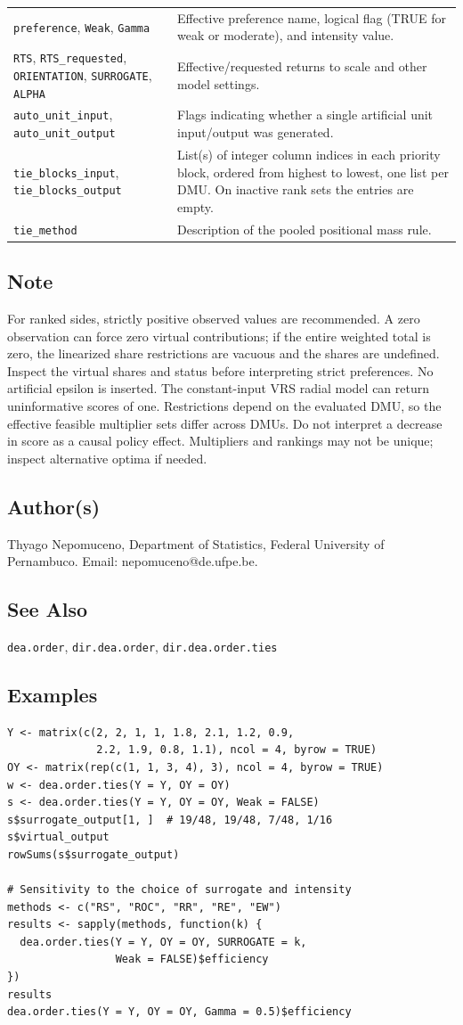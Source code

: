 \documentclass[10pt,a4paper]{article}
\newcommand{\field}[1]{\needspace{3\baselineskip}\subsection*{#1}}
\begin{document}
\begin{longtable}{@{}p{53mm}p{106mm}@{}}
\texttt{preference}, \texttt{Weak}, \texttt{Gamma} & Effective preference name, logical flag (TRUE for weak or moderate), and intensity value. \\[2pt]
\texttt{RTS}, \texttt{RTS\_requested}, \texttt{ORIENTATION}, \texttt{SURROGATE}, \texttt{ALPHA} & Effective/requested returns to scale and other model settings. \\[2pt]
\texttt{auto\_unit\_input}, \texttt{auto\_unit\_output} & Flags indicating whether a single artificial unit input/output was generated. \\[2pt]
\texttt{tie\_blocks\_input}, \texttt{tie\_blocks\_output} & List(s) of integer column indices in each priority block, ordered from highest to lowest, one list per DMU. On inactive rank sets the entries are empty. \\[2pt]
\texttt{tie\_method} & Description of the pooled positional mass rule. \\[2pt]
\end{longtable}
\field{Note}
For ranked sides, strictly positive observed values are recommended. A zero observation can force zero virtual contributions; if the entire weighted total is zero, the linearized share restrictions are vacuous and the shares are undefined. Inspect the virtual shares and status before interpreting strict preferences. No artificial epsilon is inserted. The constant-input VRS radial model can return uninformative scores of one. Restrictions depend on the evaluated DMU, so the effective feasible multiplier sets differ across DMUs. Do not interpret a decrease in score as a causal policy effect. Multipliers and rankings may not be unique; inspect alternative optima if needed.
\field{Author(s)}
Thyago Nepomuceno, Department of Statistics, Federal University of Pernambuco. Email: nepomuceno@de.ufpe.be.
\field{See Also}
\texttt{dea.order}, \texttt{dir.dea.order}, \texttt{dir.dea.order.ties}
\field{Examples}
\begin{verbatim}
Y <- matrix(c(2, 2, 1, 1, 1.8, 2.1, 1.2, 0.9,
              2.2, 1.9, 0.8, 1.1), ncol = 4, byrow = TRUE)
OY <- matrix(rep(c(1, 1, 3, 4), 3), ncol = 4, byrow = TRUE)
w <- dea.order.ties(Y = Y, OY = OY)
s <- dea.order.ties(Y = Y, OY = OY, Weak = FALSE)
s$surrogate_output[1, ]  # 19/48, 19/48, 7/48, 1/16
s$virtual_output
rowSums(s$surrogate_output)

# Sensitivity to the choice of surrogate and intensity
methods <- c("RS", "ROC", "RR", "RE", "EW")
results <- sapply(methods, function(k) {
  dea.order.ties(Y = Y, OY = OY, SURROGATE = k,
                 Weak = FALSE)$efficiency
})
results
dea.order.ties(Y = Y, OY = OY, Gamma = 0.5)$efficiency
\end{verbatim}
\end{document}
